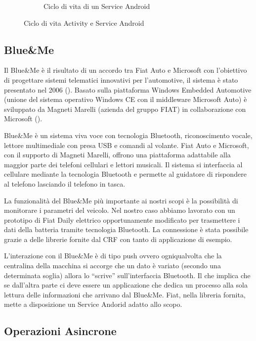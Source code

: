 \begin{figure}[H]
\begin{subfigure}[b]{0.49\textwidth}
			\caption{Ciclo di vita di un Service Android}
			\label{fig:android-service}
		\end{subfigure}
        \caption{Ciclo di vita Activity e Service Android}
\end{figure}

\subsection{Blue\&{}Me}

Il Blue\&{}Me è il risultato di un accordo tra Fiat Auto e Microsoft con l'obiettivo di progettare sistemi telematici innovativi per l'automotive, il sistema è stato presentato nel 2006 (\cite{al2012android}). Basato sulla piattaforma Windows Embedded Automotive (unione del sistema operativo Windows CE con il middleware Microsoft Auto) è sviluppato da Magneti Marelli (azienda del gruppo FIAT) in collaborazione con Microsoft (\cite{wiki:blue-me}).

Blue\&{}Me è un sistema viva voce con tecnologia Bluetooth, riconoscimento vocale, lettore multimediale con presa USB e comandi al volante. Fiat Auto e Microsoft, con il supporto di Magneti Marelli, offrono una piattaforma adattabile alla maggior parte dei telefoni cellulari e lettori musicali. Il sistema si interfaccia al cellulare mediante la tecnologia Bluetooth e permette al guidatore di rispondere al telefono lasciando il telefono in tasca. 

La funzionalità del Blue\&{}Me più importante ai nostri scopi è la possibilità di monitorare i parametri del veicolo. Nel nostro caso abbiamo lavorato con un prototipo di Fiat Daily elettrico opportunamente modificato per trasmettere i dati della batteria tramite tecnologia Bluetooth. La connessione è stata possibile grazie a delle librerie fornite dal CRF con tanto di applicazione di esempio.

L'interazione con il Blue\&{}Me è di tipo push ovvero ogniqualvolta che la centralina della macchina si accorge che un dato è variato (secondo una determinata soglia) allora lo ``scrive'' sull'interfaccia Bluetooth. Il che implica che se dall'altra parte ci deve essere un applicazione che dedica un processo alla sola lettura delle informazioni che arrivano dal Blue\&{}Me. Fiat, nella libreria fornita, mette a disposizione un Service Andorid adatto allo scopo.

\subsection{Operazioni Asincrone}

